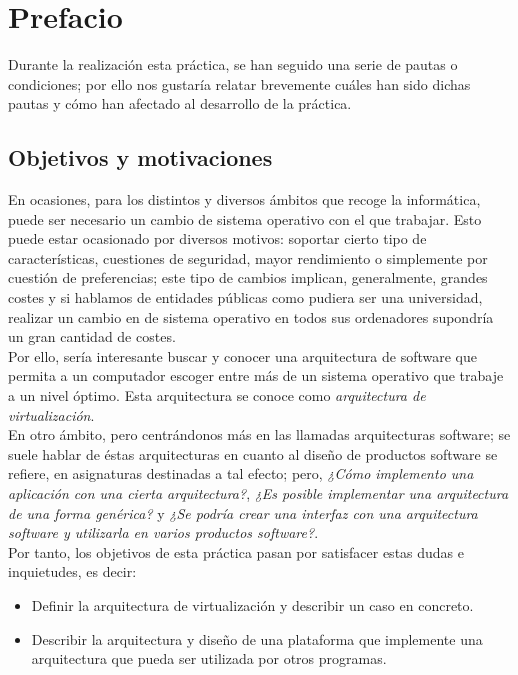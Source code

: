 \chapter*{Prefacio}

\lettrine[lines=1,slope=4pt,findent=0pt]{D}{}urante la realización esta práctica, se han seguido una serie de pautas o condiciones; por ello nos gustaría relatar brevemente cuáles han sido dichas pautas y cómo han afectado al desarrollo de la práctica.


\section*{Objetivos y motivaciones}
En ocasiones, para los distintos y diversos ámbitos que recoge la informática, puede ser necesario un cambio de sistema operativo con el que trabajar. Esto puede estar ocasionado por diversos motivos: soportar cierto tipo de características, cuestiones de seguridad, mayor rendimiento o simplemente por cuestión de preferencias; este tipo de cambios implican, generalmente, grandes costes y si hablamos de entidades públicas como pudiera ser una universidad, realizar un cambio en de sistema operativo en todos sus ordenadores supondría un gran cantidad de costes.\\

Por ello, sería interesante buscar y conocer una arquitectura de software que permita a un computador escoger entre más de un sistema operativo que trabaje a un nivel óptimo. Esta arquitectura se conoce como \emph{arquitectura de virtualización}.\\

En otro ámbito, pero centrándonos más en las llamadas arquitecturas software; se suele hablar de éstas arquitecturas en cuanto al diseño de productos software se refiere, en asignaturas destinadas a tal efecto; pero, \emph{¿Cómo implemento una aplicación con una cierta arquitectura?}, \emph{¿Es posible implementar una arquitectura de una forma genérica?} y \emph{¿Se podría crear una interfaz con una arquitectura software y utilizarla en varios productos software?}.\\

Por tanto, los objetivos de esta práctica pasan por satisfacer estas dudas e inquietudes, es decir:
\begin{itemize}
\item Definir la arquitectura de virtualización y describir un caso en concreto.
\item Describir la arquitectura y diseño de una plataforma que implemente una arquitectura que pueda ser utilizada por otros programas.
\end{itemize}

